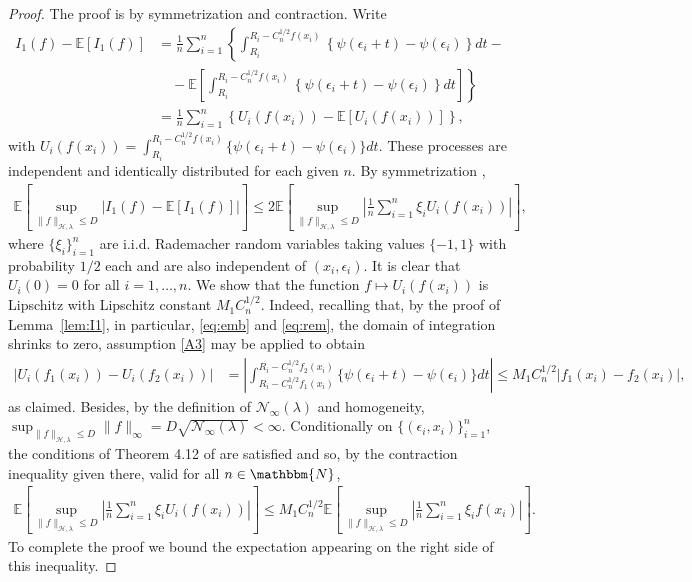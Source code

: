 \documentclass[11pt]{article}
\theoremstyle{definition}
\theoremstyle{remark}
\begin{document}
\begin{proof}
The proof is by symmetrization and contraction. Write
\begin{align*}
I_1(f) - \mathbb{E}[I_1(f)] & = \frac{1}{n} \sum_{i=1}^n \left\{  \int_{R_i}^{R_i-C_n^{1/2}f(x_i)} \left\{ \psi\left(\epsilon_i+t \right) - \psi \left( \epsilon_i \right) \right\} d t - \right. 
\\ & \left.  \quad -  \mathbb{E} \left[ \int_{R_i}^{R_i-C_n^{1/2}f(x_i)}  \left\{ \psi\left(\epsilon_i+t \right) - \psi \left( \epsilon_i \right) \right\} d t \right] \right\}
\\ & = \frac{1}{n} \sum_{i=1}^n \left\{ U_i(f(x_i)) - \mathbb{E}[U_i(f(x_i))]\right\},
\end{align*}
with $U_i(f(x_i)) = \int_{R_i}^{R_i-C_n^{1/2}f(x_i)} \{\psi(\epsilon_i+t)-\psi(\epsilon_i)\} d t$. These processes are independent and identically distributed for each given $n$. By symmetrization \citep[Lemma 2.3.1]{VDV:1996},
\begin{align*}
\mathbb{E}\left[ \sup_{\|f\|_{\mathcal{H}, \lambda} \leq D} \left|I_1(f) - \mathbb{E}[I_1(f)] \right|  \right] \leq  2 \mathbb{E}\left[\sup_{\|f\|_{\mathcal{H}, \lambda}  \leq D}\left| \frac{1}{n} \sum_{i=1}^n \xi_i U_{i}(f(x_i)) \right| \right],
\end{align*}
where $\{\xi_i\}_{i=1}^n$ are i.i.d. Rademacher random variables taking values $\{-1,1\}$ with probability $1/2$ each and are also independent of $(x_i, \epsilon_i)$. It is clear that $U_i(0) = 0$ for all $i=1, \ldots, n$. We show that the function $f \mapsto U_i(f(x_i))$ is Lipschitz with Lipschitz constant $M_1 C_n^{1/2}$. Indeed, recalling that, by the proof of Lemma~\ref{lem:I1}, in particular, \eqref{eq:emb} and \eqref{eq:rem}, the domain of integration shrinks to zero, assumption \ref{A3} may be applied to obtain
\begin{align*}
\left|U_i(f_1(x_i)) - U_i(f_2(x_i)) \right| & = \left| \int_{R_i-C_n^{1/2} f_1(x_i)}^{R_i-C_n^{1/2}f_2(x_i)} \{\psi(\epsilon_i+t) - \psi(\epsilon_i)\}  d t \right|  \leq  M_1  C_n^{1/2}|f_1(x_i)-f_2(x_i)|,
\end{align*}
as claimed. Besides, by the definition of $\mathcal{N}_{\infty}(\lambda)$ and homogeneity, $\sup_{\|f\|_{\mathcal{H},\lambda}\leq D} \|f\|_{\infty} = D \sqrt{\mathcal{N}_{\infty}(\lambda)} < \infty$. Conditionally on $\{(\epsilon_i,x_i)\}_{i=1}^n$, the conditions of Theorem 4.12 of \citep{Tal:1991} are satisfied and so, by the contraction inequality given there,  valid for all $n \in \mathbbm{N}$,
\begin{align*}
\mathbb{E}\left[\sup_{\|f\|_{\mathcal{H}, \lambda} \leq D}\left| \frac{1}{n} \sum_{i=1}^n \xi_i U_{i}(f(x_i)) \right| \right] \leq M_1 C_n^{1/2} \mathbb{E}\left[\sup_{\|f\|_{\mathcal{H}, \lambda} \leq D}\left| \frac{1}{n} \sum_{i=1}^n \xi_i f(x_i) \right| \right]. 
\end{align*}
To complete the proof we bound the expectation appearing on the right side of this inequality. 


\end{proof}
\end{document}
